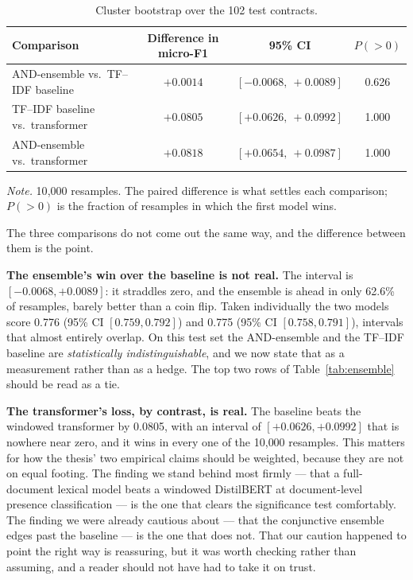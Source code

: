 \begin{table}[ht]
\centering
\caption{Cluster bootstrap over the 102 test contracts.}
\label{tab:bootstrap}
\small
\begin{tabular}{lccc}
\toprule
\textbf{Comparison} & \textbf{Difference in micro-F1} & \textbf{95\% CI} & \textbf{$P(>0)$}\\
\midrule
AND-ensemble vs.\ TF--IDF baseline & $+0.0014$ & $[-0.0068,\ +0.0089]$ & 0.626\\
TF--IDF baseline vs.\ transformer  & $+0.0805$ & $[+0.0626,\ +0.0992]$ & 1.000\\
AND-ensemble vs.\ transformer      & $+0.0818$ & $[+0.0654,\ +0.0987]$ & 1.000\\
\bottomrule
\end{tabular}

{\footnotesize\singlespacing \emph{Note.} 10{,}000 resamples. The paired difference is what settles each comparison; $P(>0)$ is the fraction of resamples in which the first model wins.\par}
\end{table}

The three comparisons do not come out the same way, and the difference between them is the point.

\textbf{The ensemble's win over the baseline is not real.} The interval is $[-0.0068, +0.0089]$: it straddles zero, and the ensemble is ahead in only 62.6\% of resamples, barely better than a coin flip. Taken individually the two models score 0.776 (95\% CI $[0.759, 0.792]$) and 0.775 (95\% CI $[0.758, 0.791]$), intervals that almost entirely overlap. On this test set the AND-ensemble and the TF--IDF baseline are \emph{statistically indistinguishable}, and we now state that as a measurement rather than as a hedge. The top two rows of Table~\ref{tab:ensemble} should be read as a tie.

\textbf{The transformer's loss, by contrast, is real.} The baseline beats the windowed transformer by 0.0805, with an interval of $[+0.0626, +0.0992]$ that is nowhere near zero, and it wins in every one of the 10{,}000 resamples. This matters for how the thesis' two empirical claims should be weighted, because they are not on equal footing. The finding we stand behind most firmly --- that a full-document lexical model beats a windowed DistilBERT at document-level presence classification --- is the one that clears the significance test comfortably. The finding we were already cautious about --- that the conjunctive ensemble edges past the baseline --- is the one that does not. That our caution happened to point the right way is reassuring, but it was worth checking rather than assuming, and a reader should not have had to take it on trust.

